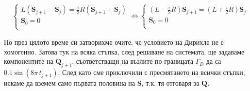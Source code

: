 \documentclass[bulgarian, 12pt]{article}
\begin{document}
\begin{large}
\begin{align*}
	&\begin{cases}
		L \left(\mathbf{S}_{j+1} - \mathbf{S}_{j}\right) = 
		\frac{\tau}{2} R \left(\mathbf{S}_{j+1} + \mathbf{S}_{j}\right)  \\
		\mathbf{S}_{0} = 0 \\
	\end{cases} \iff
	\begin{cases}
		(L - \frac{\tau}{2} R)\mathbf{S}_{j+1} = (L + \frac{\tau}{2} R) \mathbf{S}_{j} \\
		\mathbf{S}_{0} = 0 \\
	\end{cases}
\end{align*}

Но през цялото време си затворихме очите, че условието на Дирихле не е хомогенно.
Затова тук на всяка стъпка, след решаване на системата, ще задаваме компонентите на $\mathbf{Q}_{j + 1}$, съответстващи на възлите по границата $\Gamma_{D}$ да са $0.1\sin(8\pi\, t_{j+1})$. 
След като сме приключили с пресмятането на всички стъпки, искаме да вземем само първата половина на $\mathbf{S}$, т.к. тя отговаря за $\mathbf{Q}$.
\begin{comment}
    \begin{cases}
      \mathbf{Q}_{j + 1} - \mathbf{Q}_j = \frac{\tau}{2} \left( \mathbf{P}_{j + 1} + \mathbf{P}_j \right) \\
      \mathbf{P}_{j + 1} - \mathbf{P}_j = -\frac{\tau}{2} (M^0)^{-1} M^1 \left( \mathbf{Q}_{j + 1} + \mathbf{Q}_j \right) \\
      \mathbf{Q}_0 = \mathbf{P}_0 = 0 \\
    \end{cases}
\end{comment}
\begin{comment}
\begin{align*}
	&\begin{cases}
		\mathbf{S}_{j+1} - \mathbf{S}_{j} = 
		\frac{\tau}{2} A \left(\mathbf{S}_{j+1} + \mathbf{S}_{j}\right)  \\
		\mathbf{S}_{0} = 0 \\
	\end{cases} \iff
	\begin{cases}
		(I - \frac{\tau}{2} A)\mathbf{S}_{j+1} = (I + \frac{\tau}{2} A) \mathbf{S}_{j} \\
		\mathbf{S}_{0} = 0 \\
	\end{cases} \\

\end{comment}
\end{large}
\end{document}
